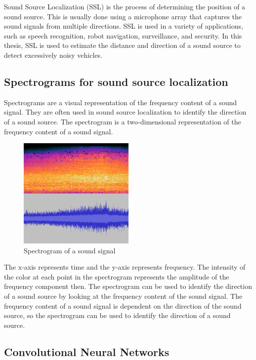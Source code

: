 Sound Source Localization (SSL) is the process of determining the position of a sound source. This is usually done using a microphone array that captures the sound signals from multiple directions. SSL is used in a variety of applications, such as speech recognition, robot navigation, surveillance, and security. In this thesis, SSL is used to estimate the distance and direction of a sound source to detect excessively noisy vehicles.

\subsection{Spectrograms for sound source localization}

Spectrograms are a visual representation of the frequency content of a sound signal. They are often used in sound source localization to identify the direction of a sound source. The spectrogram is a two-dimensional representation of the frequency content of a sound signal. 

\begin{figure}[h]
    \centering
    \includegraphics[width=0.5\textwidth]{../images/spectrogram.png}
    \caption{Spectrogram of a sound signal}
    \label{fig:spectrogram}
\end{figure}

The x-axis represents time and the y-axis represents frequency. The intensity of the color at each point in the spectrogram represents the amplitude of the frequency component then. The spectrogram can be used to identify the direction of a sound source by looking at the frequency content of the sound signal. The frequency content of a sound signal is dependent on the direction of the sound source, so the spectrogram can be used to identify the direction of a sound source.

\subsection{Convolutional Neural Networks}

